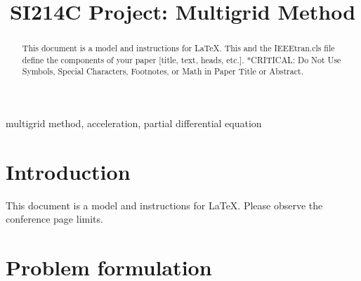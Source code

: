 \documentclass[onecolumn, conference]{IEEEtran}
\begin{document}
\title{SI214C Project: Multigrid Method\\
}

\author{
}

\maketitle

\begin{abstract}
This document is a model and instructions for \LaTeX.
This and the IEEEtran.cls file define the components of your paper [title, text, heads, etc.]. *CRITICAL: Do Not Use Symbols, Special Characters, Footnotes, 
or Math in Paper Title or Abstract.
\end{abstract}

\begin{IEEEkeywords}
multigrid method, acceleration, partial differential equation
\end{IEEEkeywords}

\section{Introduction}
This document is a model and instructions for \LaTeX.
Please observe the conference page limits. 



\section{Problem formulation}
\end{document}
